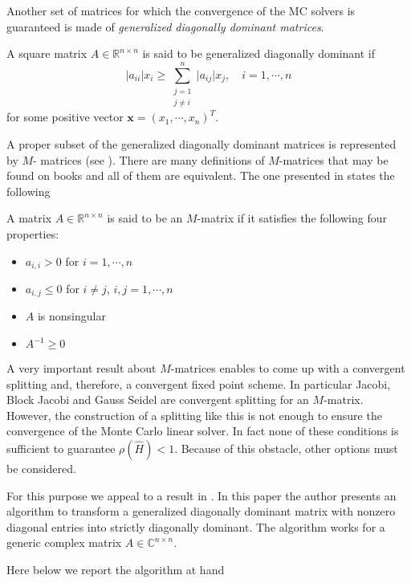  Another set of matrices for which the convergence of
the MC solvers is guaranteed is made of \textit{generalized diagonally
dominant matrices}.

\begin{defn}
A square matrix $A\in\mathbb{R}^{n\times n}$ is said to be generalized
diagonally dominant if
\[
 \lvert a_{ii}\rvert x_i \ge \sum_{\substack{j=1\\j\ne i}}^n \lvert
a_{ij}\rvert
x_j, \quad i=1,\cdots,n
\]
for some positive vector $\mathbf{x}=(x_1,\cdots,x_n)^T$.
\end{defn}

A proper subset of the generalized diagonally dominant matrices is represented
by $M$- matrices (see \cite{Ax1996}).
There are many definitions of $M$-matrices that may be found on books and all
of them are equivalent. The one presented in \cite{Saad} states the
following
\begin{defn}
A matrix $A\in\mathbb{R}^{n\times n}$ is said to be an $M$-matrix if it
satisfies the following four properties:
\begin{itemize}
 \item $a_{i,i}>0$ for $i=1,\cdots,n$
 \item $a_{i,j}\le 0$ for $i\ne j$, $i,j=1,\cdots,n$
 \item $A$ is nonsingular
 \item $A^{-1}\ge 0$
\end{itemize}
\end{defn}


A very important result about $M$-matrices enables to come up with a convergent
splitting and, therefore, a convergent fixed point scheme.
In particular Jacobi, Block Jacobi and Gauss Seidel  are
convergent
splitting for an $M$-matrix.
However, the construction of a splitting like this is not enough to ensure the
convergence of
the Monte Carlo linear solver. In fact none of these conditions is sufficient
to guarantee $\rho(\hat{H})<1$. Because of this obstacle, other options must
be considered.

For this purpose we
appeal to a result in \cite{Li2002}. In this paper the author presents an
algorithm to transform a generalized diagonally dominant matrix with
nonzero diagonal entries into strictly diagonally dominant. The
algorithm works for a generic complex matrix $A\in\mathbb{C}^{n\times n}$.

Here below we report the algorithm at hand

